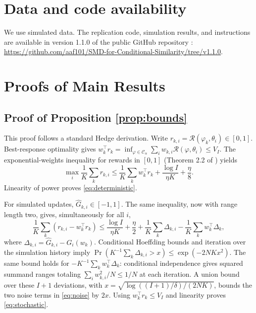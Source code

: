 \documentclass[11pt]{article}
\newcommand{\CS}{\mathcal{C}_{\alpha}}
\newcommand{\Reg}{\mathcal{R}}
\begin{document}
\section*{Data and code availability}

We use simulated data. The replication code, simulation results, and instructions are available in version 1.1.0 of the public GitHub repository \citep{aradillasReplication2026}: \url{https://github.com/aaf101/SMD-for-Conditional-Similarity/tree/v1.1.0}.

\appendix
{}
\section{Proofs of Main Results}

\subsection{Proof of Proposition \ref{prop:bounds}}

This proof follows a standard Hedge derivation. Write $r_{k,i}=\Reg(\varphi_k,\theta_i)\in[0,1]$. Best-response optimality gives $w_k^\top r_k=\inf_{\varphi\in\CS}\sum_iw_{k,i}\Reg(\varphi,\theta_i)\le V_I$. The exponential-weights inequality for rewards in $[0,1]$ (Theorem 2.2 of \cite{cesa2006prediction}) yields
\begin{equation}\label{eq:ew} \max_i\frac1K\sum_kr_{k,i}\le\frac1K\sum_kw_k^\top r_k+\frac{\log I}{\eta K}+\frac\eta8. \end{equation}
Linearity of power proves \eqref{eq:deterministic}.

For simulated updates, $\widehat G_{k,i}\in[-1,1]$. The same inequality, now with range length two, gives, simultaneously for all $i$,
\begin{equation}\label{eq:noise} \frac1K\sum_k(r_{k,i}-w_k^\top r_k)\le\frac{\log I}{\eta K}+\frac\eta2+\frac1K\sum_k\Delta_{k,i}-\frac1K\sum_kw_k^\top\Delta_k, \end{equation}
where $\Delta_{k,i}=\widehat G_{k,i}-G_i(w_k)$. Conditional Hoeffding bounds and iteration over the simulation history imply $\Pr(K^{-1}\sum_k\Delta_{k,i}>x)\le \exp(-2NKx^2)$. The same bound holds for $-K^{-1}\sum_kw_k^\top\Delta_k$: conditional independence gives squared summand ranges totaling $\sum_iw_{k,i}^2/N\le1/N$ at each iteration. A union bound over these $I+1$ deviations, with $x=\sqrt{\log((I+1)/\delta)/(2NK)}$, bounds the two noise terms in \eqref{eq:noise} by $2x$. Using $w_k^\top r_k\le V_I$ and linearity proves \eqref{eq:stochastic}.
\end{document}
